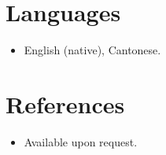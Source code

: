 \documentclass[11pt,a4paper,sans]{moderncv}
\begin{document}

\section{Languages}
\vspace{1pt}
\begin{itemize}
\item English (native), Cantonese.
\end{itemize}


\section{References}
\vspace{1pt}
\begin{itemize}
\item{Available upon request.}
\end{itemize}
\end{document}
